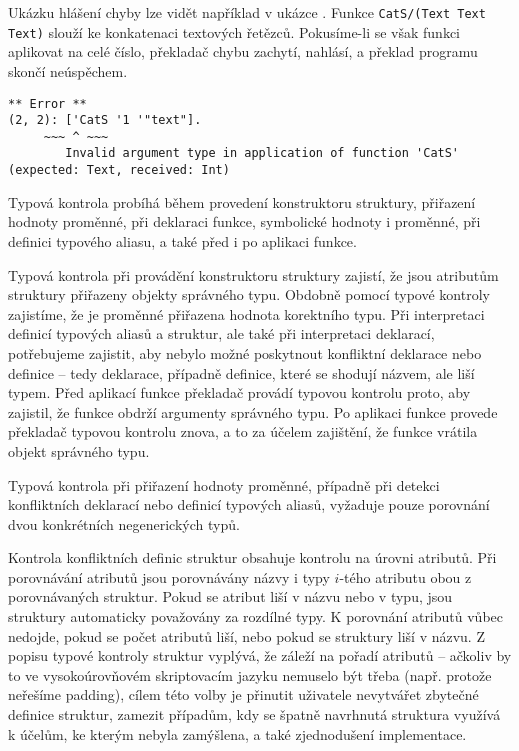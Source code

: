 Ukázku hlášení chyby lze vidět například v ukázce . Funkce
\lstinline{CatS/(Text Text Text)} slouží ke konkatenaci textových řetězců. Pokusíme-li
se však funkci aplikovat na celé číslo, překladač chybu zachytí, nahlásí, a překlad programu skončí
neúspěchem.

\begin{lstlisting}[caption={Příklad hlášení chyby},label=type-error-reporting]
  ** Error **
(2, 2): ['CatS '1 '"text"].
     ~~~ ^ ~~~
        Invalid argument type in application of function 'CatS' (expected: Text, received: Int)
\end{lstlisting}

Typová kontrola probíhá během provedení konstruktoru struktury, přiřazení hodnoty proměnné, při
deklaraci funkce, symbolické hodnoty i proměnné, při definici typového aliasu, a také před i
po aplikaci funkce.

Typová kontrola při provádění konstruktoru struktury zajistí, že jsou atributům struktury přiřazeny
objekty správného typu. Obdobně pomocí typové kontroly zajistíme, že je proměnné přiřazena hodnota
korektního typu. Při interpretaci definicí typových aliasů a struktur, ale také při interpretaci
deklarací, potřebujeme zajistit, aby nebylo možné poskytnout konfliktní deklarace nebo definice
-- tedy deklarace, případně definice, které se shodují názvem, ale liší typem. Před aplikací funkce
překladač provádí typovou kontrolu proto, aby zajistil, že funkce obdrží argumenty správného typu.
Po aplikaci funkce provede překladač typovou kontrolu znova, a to za účelem zajištění, že funkce
vrátila objekt správného typu.

Typová kontrola při přiřazení hodnoty proměnné, případně při detekci konfliktních deklarací nebo
definicí typových aliasů, vyžaduje pouze porovnání dvou konkrétních negenerických typů.

Kontrola konfliktních definic struktur obsahuje kontrolu na úrovni atributů. Při porovnávání
atributů jsou porovnávány názvy i typy $i$-tého atributu obou z porovnávaných struktur. Pokud se
atribut liší v názvu nebo v typu, jsou struktury automaticky považovány za rozdílné typy.
K porovnání atributů vůbec nedojde, pokud se počet atributů liší, nebo pokud se struktury liší
v názvu. Z popisu typové kontroly struktur vyplývá, že záleží na pořadí atributů -- ačkoliv by to
ve vysokoúrovňovém skriptovacím jazyku nemuselo být třeba (např. protože neřešíme padding), cílem
této volby je přinutit uživatele nevytvářet zbytečné definice struktur, zamezit případům, kdy
se špatně navrhnutá struktura využívá k účelům, ke kterým nebyla zamýšlena, a také zjednodušení
implementace.

